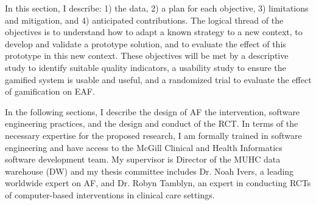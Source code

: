 In this section, I describe: 1) the data, 2) a plan for each objective, 3) limitations and mitigation, and 4) anticipated contributions. The logical thread of the objectives is to understand how to adapt a known strategy to a new context, to develop and validate a prototype solution, and to evaluate the effect of this prototype in this new context. These objectives will be met by a descriptive study to identify suitable quality indicators, a usability study to ensure the gamified system is usable and useful, and a randomized trial to evaluate the effect of gamification on \gls{EAF}.

In the following sections, I describe the design of \gls{AF} the intervention, software engineering practices, and the design and conduct of the \gls{RCT}. In terms of the necessary expertise for the proposed research, I am formally trained in software engineering and have access to the McGill Clinical and Health Informatics software development team. My supervisor is Director of the MUHC data warehouse (DW) and my thesis committee includes Dr. Noah Ivers, a leading worldwide expert on \gls{AF}, and Dr. Robyn Tamblyn, an expert in conducting \gls{RCT}s of computer-based interventions in clinical care settings.